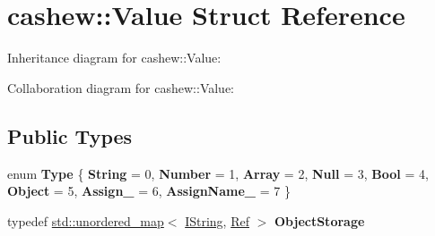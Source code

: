 \hypertarget{structcashew_1_1_value}{}\section{cashew\+:\+:Value Struct Reference}
\label{structcashew_1_1_value}


Inheritance diagram for cashew\+:\+:Value\+:


Collaboration diagram for cashew\+:\+:Value\+:
\subsection*{Public Types}
\begin{DoxyCompactItemize}
\item 
\mbox{\label{structcashew_1_1_value_ae531c573fb61a2a71bf0e20ce342cc6b}} 
enum {\bfseries Type} \{ \newline
{\bfseries String} = 0, 
{\bfseries Number} = 1, 
{\bfseries Array} = 2, 
{\bfseries Null} = 3, 
\newline
{\bfseries Bool} = 4, 
{\bfseries Object} = 5, 
{\bfseries Assign\+\_\+} = 6, 
{\bfseries Assign\+Name\+\_\+} = 7
 \}
\item 
\mbox{\label{structcashew_1_1_value_a98766ae962aa6f7f395bd76c43606935}} 
typedef \mbox{\hyperlink{classstd_1_1unordered__map}{std\+::unordered\+\_\+map}}$<$ \mbox{\hyperlink{structcashew_1_1_i_string}{I\+String}}, \mbox{\hyperlink{structcashew_1_1_ref}{Ref}} $>$ {\bfseries Object\+Storage}
\end{DoxyCompactItemize}

